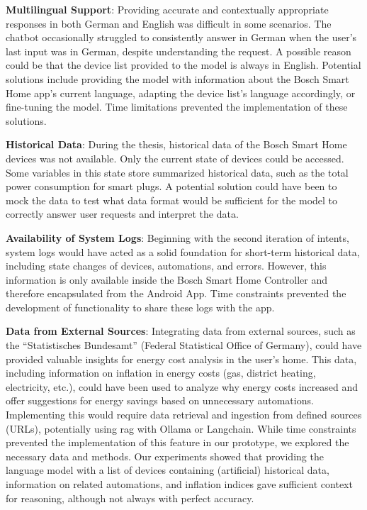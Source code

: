 \textbf{Multilingual Support}: Providing accurate and contextually appropriate responses in both German and English was difficult in some scenarios. The chatbot occasionally struggled to consistently answer in German when the user's last input was in German, despite understanding the request. A possible reason could be that the device list provided to the model is always in English. Potential solutions include providing the model with information about the Bosch Smart Home app's current language, adapting the device list's language accordingly, or fine-tuning the model. Time limitations prevented the implementation of these solutions.

\textbf{Historical Data}: During the thesis, historical data of the Bosch Smart Home devices was not available. Only the current state of devices could be accessed. Some variables in this state store summarized historical data, such as the total power consumption for smart plugs. A potential solution could have been to mock the data to test what data format would be sufficient for the model to correctly answer user requests and interpret the data.

\textbf{Availability of System Logs}: Beginning with the second iteration of intents, system logs would have acted as a solid foundation for short-term historical data, including state changes of devices, automations, and errors. However, this information is only available inside the Bosch Smart Home Controller and therefore encapsulated from the Android App. Time constraints prevented the development of functionality to share these logs with the app.

\textbf{Data from External Sources}: Integrating data from external sources, such as the ``Statistisches Bundesamt'' (Federal Statistical Office of Germany), could have provided valuable insights for energy cost analysis in the user's home. This data, including information on inflation in energy costs (gas, district heating, electricity, etc.), could have been used to analyze why energy costs increased and offer suggestions for energy savings based on unnecessary automations. Implementing this would require data retrieval and ingestion from defined sources (URLs), potentially using \gls{rag} with Ollama or Langchain. While time constraints prevented the implementation of this feature in our prototype, we explored the necessary data and methods. Our experiments showed that providing the language model with a list of devices containing (artificial) historical data, information on related automations, and inflation indices gave sufficient context for reasoning, although not always with perfect accuracy.
    
